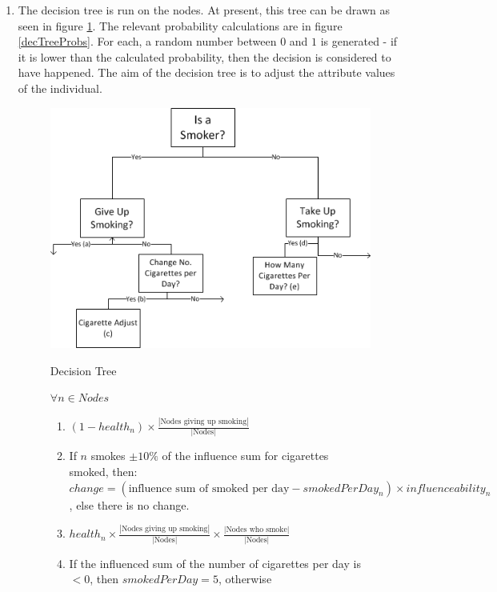 \documentclass[]{article}
\begin{document}
\begin{enumerate}
\item The decision tree is run on the nodes. At present, this tree can be drawn as seen in figure \ref{dectree}. The relevant probability calculations are in figure \ref{decTreeProbs}.  For each, a random number between $0$ and $1$ is generated - if it is lower than the calculated probability, then the decision is considered to have happened. The aim of the decision tree is to adjust the attribute values of the individual.
\begin{figure}[h]
\begin{center}
\includegraphics{DecTreeBasic2.png}
\label{dectree}
\caption{Decision Tree}
\end{center}
\end{figure}


\begin{figure}[h]
	$\forall n \in Nodes$

	\begin{enumerate}
		\item $(1-health_{n}) \times \frac{|\text{Nodes giving up smoking}|}{|\text{Nodes}|}$
		\item If $n$ smokes $\pm10\%$ of the influence sum for cigarettes smoked, then: \\
		$change = (\text{influence sum of smoked per day} - {smokedPerDay}_{n}) \times influenceability_{n}$, else there is no change.
		\item $health_{n} \times \frac{|\text{Nodes giving up smoking}|}{|\text{Nodes}|} \times \frac{|\text{Nodes who smoke}|}{|\text{Nodes}|}$
		\item If the influenced sum of the number of cigarettes per day is $< 0$, then $smokedPerDay = 5$, otherwise \\
		

\end{enumerate}
\end{figure}
\end{enumerate}
\end{document}
